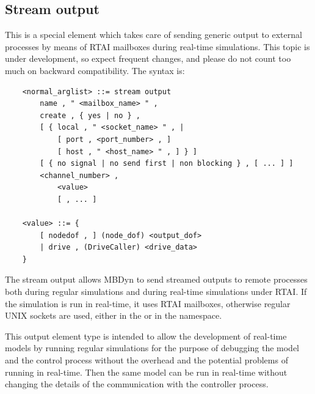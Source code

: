 \subsection{Stream output}\label{sec:EL:BASE:STREAM_OUTPUT}
This is a special element which takes care of sending generic output
to external processes by means of RTAI mailboxes during real-time 
simulations.
This topic is under development, so expect frequent changes, and
please do not count too much on backward compatibility.
The syntax is:
\begin{verbatim}
    <normal_arglist> ::= stream output
        name , " <mailbox_name> " ,
        create , { yes | no } ,
        [ { local , " <socket_name> " , |
            [ port , <port_number> , ]
            [ host , " <host_name> " , ] } ]
        [ { no signal | no send first | non blocking } , [ ... ] ]
        <channel_number> ,
            <value>
            [ , ... ]

    <value> ::= {
        [ nodedof , ] (node_dof) <output_dof>
        | drive , (DriveCaller) <drive_data>
    }
\end{verbatim}
The stream output allows MBDyn to send streamed outputs 
to remote processes both during regular simulations and during 
real-time simulations under RTAI.
If the simulation is run in real-time, it uses RTAI mailboxes, 
otherwise regular UNIX sockets are used, either in the  or 
in the  namespace.

This output element type is intended to allow the development 
of real-time models by running regular simulations for the purpose 
of debugging the model and the control process without the overhead 
and the potential problems of running in real-time.
Then the same model can be run in real-time without changing the details
of the communication with the controller process.

